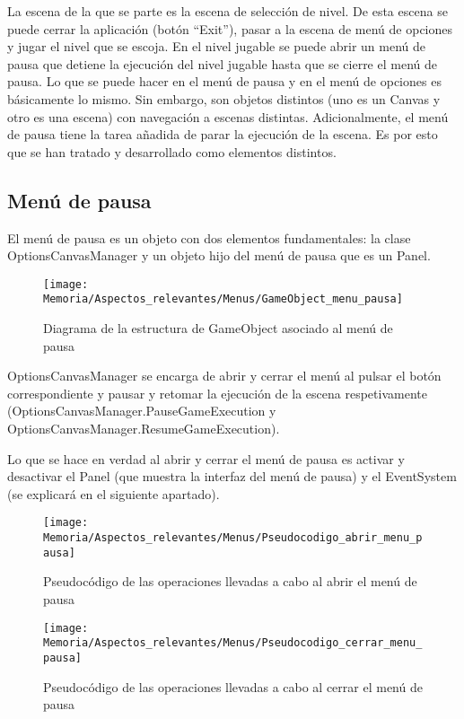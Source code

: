 La escena de la que se parte es la escena de selección de nivel. De esta escena se puede cerrar la aplicación (botón “Exit”), pasar a la escena de menú de opciones y jugar el nivel que se escoja.
En el nivel jugable se puede abrir un menú de pausa que detiene la ejecución del nivel jugable hasta que se cierre el menú de pausa.
Lo que se puede hacer en el menú de pausa y en el menú de opciones es básicamente lo mismo. Sin embargo, son objetos distintos (uno es un Canvas y otro es una escena) con navegación a escenas distintas. Adicionalmente, el menú de pausa tiene la tarea añadida de parar la ejecución de la escena. Es por esto que se han tratado y desarrollado como elementos distintos.

\subsection{Menú de pausa}
El menú de pausa es un objeto con dos elementos fundamentales: la clase OptionsCanvasManager y un objeto hijo del menú de pausa que es un Panel.

\clearpage
\begin{figure}[h]
\texttt{[image: Memoria/Aspectos\_relevantes/Menus/GameObject\_menu\_pausa]}
\caption{Diagrama de la estructura de GameObject asociado al menú de pausa}
\end{figure}

OptionsCanvasManager se encarga de abrir y cerrar el menú al pulsar el botón correspondiente y pausar y retomar la ejecución de la escena respetivamente (OptionsCanvasManager.PauseGameExecution y OptionsCanvasManager.ResumeGameExecution).

Lo que se hace en verdad al abrir y cerrar el menú de pausa es activar y desactivar el Panel (que muestra la interfaz del menú de pausa) y el EventSystem (se explicará en el siguiente apartado).

\begin{figure}[h]
\texttt{[image: Memoria/Aspectos\_relevantes/Menus/Pseudocodigo\_abrir\_menu\_pausa]}
\caption{Pseudocódigo de las operaciones llevadas a cabo al abrir el menú de pausa}
\end{figure}

\begin{figure}[h]
\texttt{[image: Memoria/Aspectos\_relevantes/Menus/Pseudocodigo\_cerrar\_menu\_pausa]}
\caption{Pseudocódigo de las operaciones llevadas a cabo al cerrar el menú de pausa}
\end{figure}

